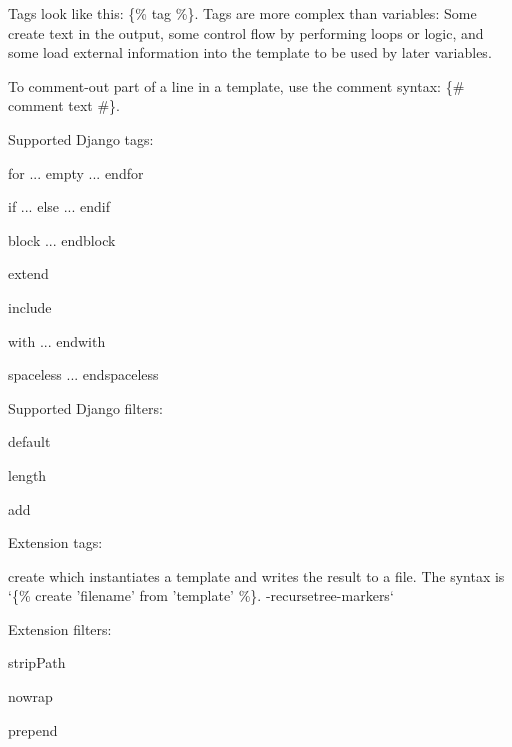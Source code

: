 Tags look like this\-: {\ttfamily \{\% tag \%\}}. Tags are more complex than variables\-: Some create text in the output, some control flow by performing loops or logic, and some load external information into the template to be used by later variables.

To comment-\/out part of a line in a template, use the comment syntax\-: {\ttfamily \{\# comment text \#\}}.

Supported Django tags\-:
\begin{DoxyItemize}
\item {\ttfamily for ... empty ... endfor}
\item {\ttfamily if ... else ... endif}
\item {\ttfamily block ... endblock}
\item {\ttfamily extend}
\item {\ttfamily include}
\item {\ttfamily with ... endwith}
\item {\ttfamily spaceless ... endspaceless}
\end{DoxyItemize}

Supported Django filters\-:
\begin{DoxyItemize}
\item {\ttfamily default}
\item {\ttfamily length}
\item {\ttfamily add}
\end{DoxyItemize}

Extension tags\-:
\begin{DoxyItemize}
\item {\ttfamily create} which instantiates a template and writes the result to a file. The syntax is `\{\% create 'filename' from 'template' \%\}{\ttfamily . -\/}recursetree{\ttfamily  -\/}markers`
\end{DoxyItemize}

Extension filters\-:
\begin{DoxyItemize}
\item {\ttfamily strip\-Path}
\item {\ttfamily nowrap}
\item {\ttfamily prepend} 
\end{DoxyItemize}